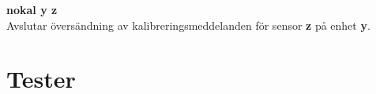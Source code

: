 \documentclass{article}
\begin{document}
    \textbf{nokal y z} \\
    Avslutar översändning av kalibreringsmeddelanden för sensor \textbf{z} på enhet \textbf{y}.


	\clearpage
	\section{Tester}
    		\label{bilaga:tester}
     	
	
	
	
	
         
         
         
         
         
         
\end{document}
